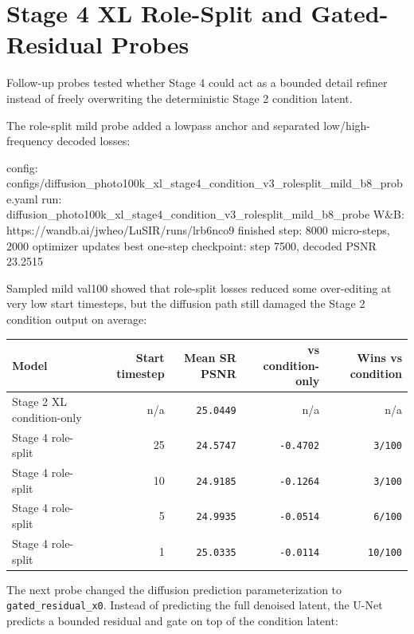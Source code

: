 \documentclass[
  10pt,
]{article}
\newenvironment{Shaded}{}{}
\newcommand{\NormalTok}[1]{#1}
\begin{document}
\hypertarget{stage-4-xl-role-split-and-gated-residual-probes}{%
\section{Stage 4 XL Role-Split and Gated-Residual
Probes}\label{stage-4-xl-role-split-and-gated-residual-probes}}

Follow-up probes tested whether Stage 4 could act as a bounded detail
refiner instead of freely overwriting the deterministic Stage 2
condition latent.

The role-split mild probe added a lowpass anchor and separated
low/high-frequency decoded losses:

\begin{Shaded}
\begin{Highlighting}[]
\NormalTok{config: configs/diffusion\_photo100k\_xl\_stage4\_condition\_v3\_rolesplit\_mild\_b8\_probe.yaml}
\NormalTok{run: diffusion\_photo100k\_xl\_stage4\_condition\_v3\_rolesplit\_mild\_b8\_probe}
\NormalTok{W\&B: https://wandb.ai/jwheo/LuSIR/runs/lrb6nco9}
\NormalTok{finished step: 8000 micro{-}steps, 2000 optimizer updates}
\NormalTok{best one{-}step checkpoint: step 7500, decoded PSNR 23.2515}
\end{Highlighting}
\end{Shaded}

Sampled mild val100 showed that role-split losses reduced some
over-editing at very low start timesteps, but the diffusion path still
damaged the Stage 2 condition output on average:

\begin{longtable}[]{@{}lrrrr@{}}
\toprule\noalign{}
Model & Start timestep & Mean SR PSNR & vs condition-only & Wins vs
condition \\
\midrule\noalign{}
\endhead
\bottomrule\noalign{}
\endlastfoot
Stage 2 XL condition-only & n/a & \texttt{25.0449} & n/a & n/a \\
Stage 4 role-split & 25 & \texttt{24.5747} & \texttt{-0.4702} &
\texttt{3/100} \\
Stage 4 role-split & 10 & \texttt{24.9185} & \texttt{-0.1264} &
\texttt{3/100} \\
Stage 4 role-split & 5 & \texttt{24.9935} & \texttt{-0.0514} &
\texttt{6/100} \\
Stage 4 role-split & 1 & \texttt{25.0335} & \texttt{-0.0114} &
\texttt{10/100} \\
\end{longtable}

The next probe changed the diffusion prediction parameterization to
\texttt{gated\_residual\_x0}. Instead of predicting the full denoised
latent, the U-Net predicts a bounded residual and gate on top of the
condition latent:
\end{document}
